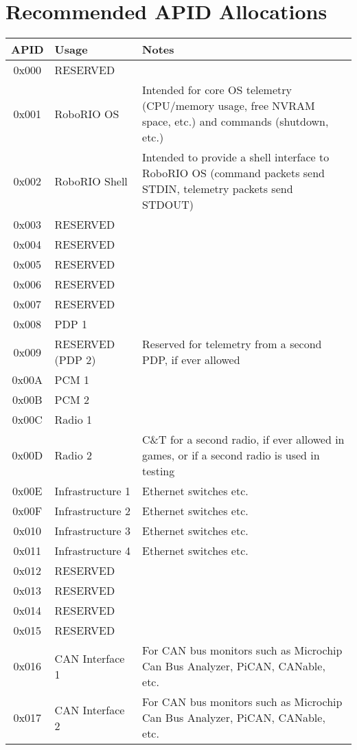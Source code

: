 \documentclass[12pt]{article}
\begin{document}
\section{Recommended APID Allocations}
\label{app:APIDs}
\begin{longtable}{|c|l|p{2in}|}
	\hline
	\textbf{APID} & \textbf{Usage} & \textbf{Notes}\\ \hline
	0x000 & RESERVED &\\ \hline
	0x001 & RoboRIO OS & Intended for core OS telemetry (CPU/memory usage, free NVRAM space, etc.) and commands (shutdown, etc.)\\ \hline
	0x002 & RoboRIO Shell & Intended to provide a shell interface to RoboRIO OS (command packets send STDIN, telemetry packets send STDOUT)\\ \hline
	0x003 & RESERVED &\\ \hline
	0x004 & RESERVED &\\ \hline
	0x005 & RESERVED &\\ \hline
	0x006 & RESERVED &\\ \hline
	0x007 & RESERVED &\\ \hline
	0x008 & PDP 1 & \\ \hline
	0x009 & RESERVED (PDP 2) & Reserved for telemetry from a second PDP, if ever allowed\\ \hline
	0x00A & PCM 1 &\\ \hline
	0x00B & PCM 2 &\\ \hline
	0x00C & Radio 1 &\\ \hline
	0x00D & Radio 2 & C\&T for a second radio, if ever allowed in games, or if a second radio is used in testing\\ \hline
	0x00E & Infrastructure 1 & Ethernet switches etc.\\ \hline
	0x00F & Infrastructure 2 & Ethernet switches etc.\\ \hline
	0x010 & Infrastructure 3 & Ethernet switches etc.\\ \hline
	0x011 & Infrastructure 4 & Ethernet switches etc.\\ \hline
	0x012 & RESERVED &\\ \hline
	0x013 & RESERVED &\\ \hline
	0x014 & RESERVED &\\ \hline
	0x015 & RESERVED &\\ \hline
	0x016 & CAN Interface 1 & For CAN bus monitors such as Microchip Can Bus Analyzer, PiCAN, CANable, etc. \\ \hline
	0x017 & CAN Interface 2 & For CAN bus monitors such as Microchip Can Bus Analyzer, PiCAN, CANable, etc. \\ \hline

\end{longtable}
\end{document}
